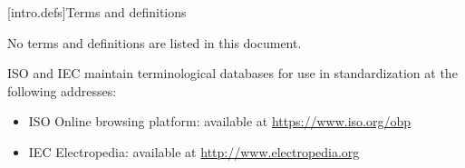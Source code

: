 
[intro.defs]{Terms and definitions}

\setcounter{section}{1}
\setcounter{tocdepth}{0}

\setcounter{tocdepth}{1}

No terms and definitions are listed in this document.

ISO and IEC maintain terminological databases for use in standardization at 
the following addresses:
\begin{itemize}
    \item ISO Online browsing platform: available at \url{https://www.iso.org/obp}
    \item IEC Electropedia: available at \url{http://www.electropedia.org}
\end{itemize}


